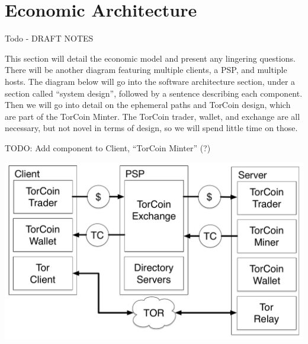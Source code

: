 \section{Economic Architecture} \label{econarch}

Todo - DRAFT NOTES

This section will detail the economic model and present any lingering questions. There will be another diagram featuring multiple clients, a PSP, and multiple hosts. The diagram below will go into the software architecture section, under a section called ``system design'', followed by a sentence describing each component. Then we will go into detail on the ephemeral paths and TorCoin design, which are part of the TorCoin Minter. The TorCoin trader, wallet, and exchange are all necessary, but not novel in terms of design, so we will spend little time on those.

TODO: Add component to Client, ``TorCoin Minter'' (?)

\includegraphics[scale=0.5]{figures/overview.pdf}